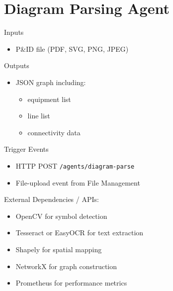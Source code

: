\documentclass[12pt]{report}
\begin{document}
\section{Diagram Parsing Agent}
\begin{description}
  \item Inputs 
    \begin{itemize}
      \item  P\&ID file (PDF, SVG, PNG, JPEG)
    \end{itemize}
  \item Outputs 
    \begin{itemize}
      \item JSON graph including:
      \begin{itemize}
        \item equipment list  
        \item line list  
        \item connectivity data  
      \end{itemize}
    \end{itemize}
  \item Trigger Events
    \begin{itemize}
      \item HTTP POST \texttt{/agents/diagram-parse}
      \item File-upload event from File Management
    \end{itemize}
  \item External Dependencies / APIs:
    \begin{itemize}
      \item OpenCV for symbol detection  
      \item Tesseract or EasyOCR for text extraction  
      \item Shapely for spatial mapping  
      \item NetworkX for graph construction  
      \item Prometheus for performance metrics  
    \end{itemize}
\end{description}
\end{document}
